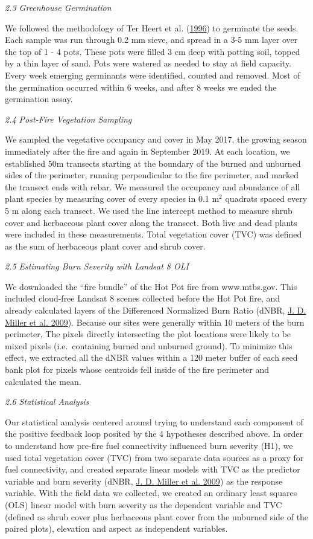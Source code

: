 \documentclass[
  12pt,
]{article}
\begin{document}
\emph{2.3 Greenhouse Germination}

We followed the methodology of Ter Heert et al.
(\protect\hyperlink{ref-Heerdt1996}{1996}) to germinate the seeds. Each
sample was run through 0.2 mm sieve, and spread in a 3-5 mm layer over
the top of 1 - 4 pots. These pots were filled 3 cm deep with potting
soil, topped by a thin layer of sand. Pots were watered as needed to
stay at field capacity. Every week emerging germinants were identified,
counted and removed. Most of the germination occurred within 6 weeks,
and after 8 weeks we ended the germination assay.

\emph{2.4 Post-Fire Vegetation Sampling}

We sampled the vegetative occupancy and cover in May 2017, the growing
season immediately after the fire and again in September 2019. At each
location, we established 50m transects starting at the boundary of the
burned and unburned sides of the perimeter, running perpendicular to the
fire perimeter, and marked the transect ends with rebar. We measured the
occupancy and abundance of all plant species by measuring cover of every
species in 0.1 m\(^2\) quadrats spaced every 5 m along each transect. We
used the line intercept method to measure shrub cover and herbaceous
plant cover along the transect. Both live and dead plants were included
in these measurements. Total vegetation cover (TVC) was defined as the
sum of herbaceous plant cover and shrub cover.

\emph{2.5 Estimating Burn Severity with Landsat 8 OLI}

We downloaded the ``fire bundle'' of the Hot Pot fire from www.mtbs.gov.
This included cloud-free Landsat 8 scenes collected before the Hot Pot
fire, and already calculated layers of the Differenced Normalized Burn
Ratio (dNBR, \protect\hyperlink{ref-Miller2009}{J. D. Miller et al.
2009}). Because our sites were generally within 10 meters of the burn
perimeter, The pixels directly intersecting the plot locations were
likely to be mixed pixels (i.e.~containing burned and unburned ground).
To minimize this effect, we extracted all the dNBR values within a 120
meter buffer of each seed bank plot for pixels whose centroids fell
inside of the fire perimeter and calculated the mean.

\emph{2.6 Statistical Analysis}

Our statistical analysis centered around trying to understand each
component of the positive feedback loop posited by the 4 hypotheses
described above. In order to understand how pre-fire fuel connectivity
influenced burn severity (H1), we used total vegetation cover (TVC) from
two separate data sources as a proxy for fuel connectivity, and created
separate linear models with TVC as the predictor variable and burn
severity (dNBR, \protect\hyperlink{ref-Miller2009}{J. D. Miller et al.
2009}) as the response variable. With the field data we collected, we
created an ordinary least squares (OLS) linear model with burn severity
as the dependent variable and TVC (defined as shrub cover plus
herbaceous plant cover from the unburned side of the paired plots),
elevation and aspect as independent variables.
\end{document}
